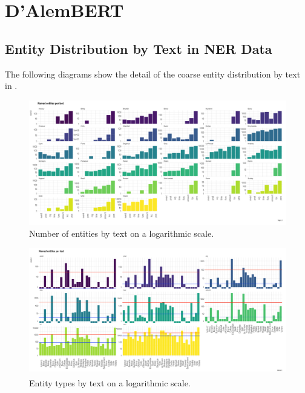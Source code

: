 \chapter{D'AlemBERT}

\section{Entity Distribution by Text in NER Data}

The following diagrams show the detail of the coarse entity distribution by text in \freemner.

\begin{figure}
    \centering
    \includegraphics[width=\textwidth]{static/media/mod_eval/dalembert/freem_ner_entities_by_text.png}
    \caption{Number of entities by text on a logarithmic scale.}
    \label{fig:entities-by-text}
\end{figure}

\begin{figure}
    \centering
    \includegraphics[width=\textwidth]{static/media/mod_eval/dalembert/freem_ner_entity_type_by_text.png}
    \caption{Entity types by text on a logarithmic scale.}
    \label{fig:entity-type-per-text}
\end{figure}
\clearpage

